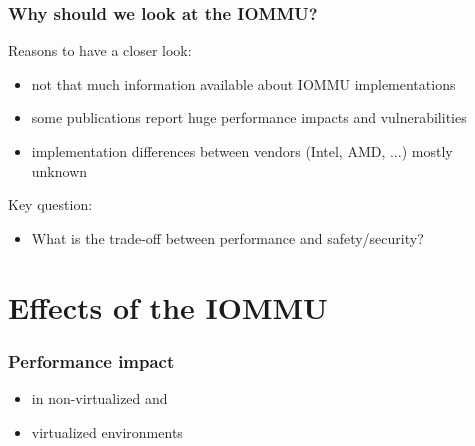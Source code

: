 \begin{frame}
    \frametitle{Why should we look at the IOMMU?}

    Reasons to have a closer look:
    \begin{itemize}
        \item not that much information available about IOMMU implementations
        \item some publications report huge performance impacts and
            vulnerabilities
        \item implementation differences between vendors (Intel, AMD, ...)
            mostly unknown
    \end{itemize}

    \vspace{1em}
    Key question:
    \begin{itemize}
        \item What is the trade-off between performance and safety/security?
    \end{itemize}
\end{frame}

\section{Effects of the IOMMU}

\begin{frame}
    \frametitle{Performance impact}

    \begin{itemize}
        \item in non-virtualized and
        \item virtualized environments
    \end{itemize}
\end{frame}

